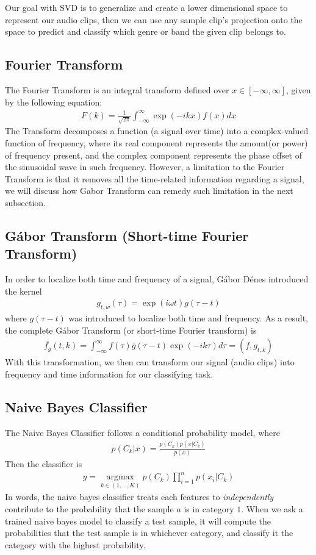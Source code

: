 \documentclass[12pt, a4paper]{article}
\begin{document}
Our goal with SVD is to generalize and create a lower dimensional space to represent our audio clips, then we can use any sample clip's projection onto the space to predict and classify which genre or band the given clip belongs to.
\subsection{Fourier Transform}
The Fourier Transform is an integral transform defined over $x \in [-\infty, \infty]$, given by the following equation:
\begin{align}
F(k)  = \frac{1}{\sqrt{2\pi}}\int_{-\infty}^{\infty} \exp(-ikx)f(x)dx
\end{align}
The Transform decomposes a function (a signal over time) into a complex-valued function of frequency, where its real component represents the amount(or power) of frequency present, and the complex component represents the phase offset of the sinusoidal wave in such frequency. However, a limitation to the Fourier Transform is that it removes all the time-related information regarding a signal, we will discuss how Gabor Transform can remedy such limitation in the next subsection.

\subsection{G\'abor Transform (Short-time Fourier Transform)}
In order to localize both time and frequency of a signal, G\'abor D\'enes introduced the kernel
\begin{align}
g_{t,w}(\tau) = \exp(i\omega t)g(\tau - t)
\end{align}
where $g(\tau - t)$ was introduced to localize both time and frequency. As a result, the complete G\'abor Transform (or short-time Fourier transform) is 
\begin{align}
\bar{f_g}(t,k) = \int_{-\infty}^{\infty} f(\tau)\bar{g}(\tau - t) \exp(-ik\tau) d\tau = (f,g_{t,k})
\end{align}
With this transformation, we then can transform our signal (audio clips) into frequency and time information for our classifying task.
\subsection{Naive Bayes Classifier}
The Naive Bayes Classifier follows a conditional probability model, where
\begin{align}
p(C_k|x) = \frac{p(C_k)p(x|C_k)}{p(x)}
\end{align}
Then the classifier is
\begin{align}
\hat{y} = \operatorname*{argmax}_{k\in(1,\ldots, K)} p(C_k) \prod _{i=1}^{n} p(x_i|C_k)
\end{align}
In words, the naive bayes classifier treats each features to \textit{independently} contribute to the probability that the sample $a$ is in category $1$. When we ask a trained naive bayes model to classify a test sample, it will compute the probabilities that the test sample is in whichever category, and classify it the category with the highest probability.
\end{document}
